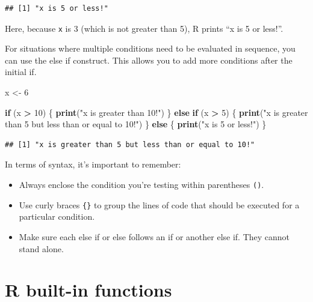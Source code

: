 \documentclass[
]{book}
\newenvironment{Shaded}{\begin{snugshade}}{\end{snugshade}}
\newcommand{\ControlFlowTok}[1]{\textcolor[rgb]{0.13,0.29,0.53}{\textbf{#1}}}
\newcommand{\DecValTok}[1]{\textcolor[rgb]{0.00,0.00,0.81}{#1}}
\newcommand{\FunctionTok}[1]{\textcolor[rgb]{0.13,0.29,0.53}{\textbf{#1}}}
\newcommand{\NormalTok}[1]{#1}
\newcommand{\OtherTok}[1]{\textcolor[rgb]{0.56,0.35,0.01}{#1}}
\newcommand{\SpecialCharTok}[1]{\textcolor[rgb]{0.81,0.36,0.00}{\textbf{#1}}}
\newcommand{\StringTok}[1]{\textcolor[rgb]{0.31,0.60,0.02}{#1}}
\providecommand{\tightlist}{%
  \setlength{\itemsep}{0pt}\setlength{\parskip}{0pt}}
\begin{document}
\begin{verbatim}
## [1] "x is 5 or less!"
\end{verbatim}

Here, because \texttt{x} is 3 (which is not greater than 5), R prints ``x is 5 or less!''.

For situations where multiple conditions need to be evaluated in sequence, you can use the else if construct. This allows you to add more conditions after the initial if.

\begin{Shaded}
\begin{Highlighting}[]
\NormalTok{x }\OtherTok{\textless{}{-}} \DecValTok{6}

\ControlFlowTok{if}\NormalTok{ (x }\SpecialCharTok{\textgreater{}} \DecValTok{10}\NormalTok{) \{}
  \FunctionTok{print}\NormalTok{(}\StringTok{"x is greater than 10!"}\NormalTok{)}
\NormalTok{\} }\ControlFlowTok{else} \ControlFlowTok{if}\NormalTok{ (x }\SpecialCharTok{\textgreater{}} \DecValTok{5}\NormalTok{) \{}
  \FunctionTok{print}\NormalTok{(}\StringTok{"x is greater than 5 but less than or equal to 10!"}\NormalTok{)}
\NormalTok{\} }\ControlFlowTok{else}\NormalTok{ \{}
  \FunctionTok{print}\NormalTok{(}\StringTok{"x is 5 or less!"}\NormalTok{)}
\NormalTok{\}}
\end{Highlighting}
\end{Shaded}

\begin{verbatim}
## [1] "x is greater than 5 but less than or equal to 10!"
\end{verbatim}

In terms of syntax, it's important to remember:

\begin{itemize}
\tightlist
\item
  Always enclose the condition you're testing within parentheses \texttt{()}.\\
\item
  Use curly braces \texttt{\{\}} to group the lines of code that should be executed for a particular condition.\\
\item
  Make sure each else if or else follows an if or another else if. They cannot stand alone.
\end{itemize}

\hypertarget{r-built-in-functions}{%
\section{R built-in functions}\label{r-built-in-functions}}
\end{document}
